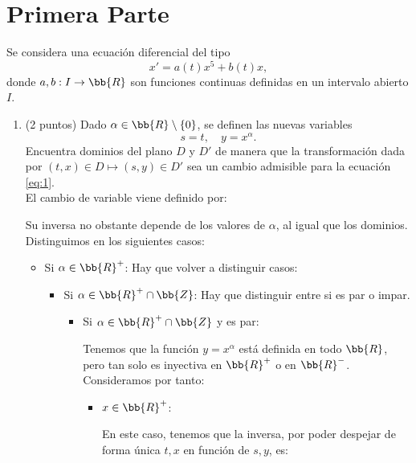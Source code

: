 \documentclass[12pt]{article}
\begin{document}
    \section{Primera Parte}
\begin{ejercicio}[6 puntos]
    Se considera una ecuación diferencial del tipo
    \begin{equation}\label{eq:1}
        x' = a(t)x^5 + b(t)x,
    \end{equation}
    donde $a, b : I \to \bb{R}$ son funciones continuas definidas en un intervalo abierto $I$.
    \begin{enumerate}
        \item (2 puntos) Dado $\alpha \in \bb{R} \setminus \{0\}$, se definen las nuevas variables
        \[
            s = t, \quad y = x^\alpha.
        \]
        Encuentra dominios del plano $D$ y $D'$ de manera que la transformación dada por $(t, x) \in D \mapsto (s, y) \in D'$ sea un cambio admisible para la ecuación \eqref{eq:1}.\\

        El cambio de variable viene definido por:

        Su inversa no obstante depende de los valores de $\alpha$, al igual que los dominios. Distinguimos en los siguientes casos:
        \begin{itemize}
            \item Si $\alpha\in \bb{R}^+$: Hay que volver a distinguir casos:
            \begin{itemize}
                \item Si $\alpha\in \bb{R}^+\cap \bb{Z}$: Hay que distinguir entre si es par o impar.
                \begin{itemize}
                    \item Si $\alpha\in \bb{R}^+\cap \bb{Z}$ y es par:
                    
                    Tenemos que la función $y=x^\alpha$ está definida en todo $\bb{R}$, pero tan solo es inyectiva en $\bb{R}^+$ o en $\bb{R}^-$. Consideramos por tanto:
                    \begin{itemize}
                        \item $x\in \bb{R}^+$:
                        
                        En este caso, tenemos que la inversa, por poder despejar de forma única $t,x$ en función de $s,y$, es:


\end{itemize}
\end{itemize}
\end{itemize}
\end{itemize}
\end{enumerate}
\end{ejercicio}
\end{document}
